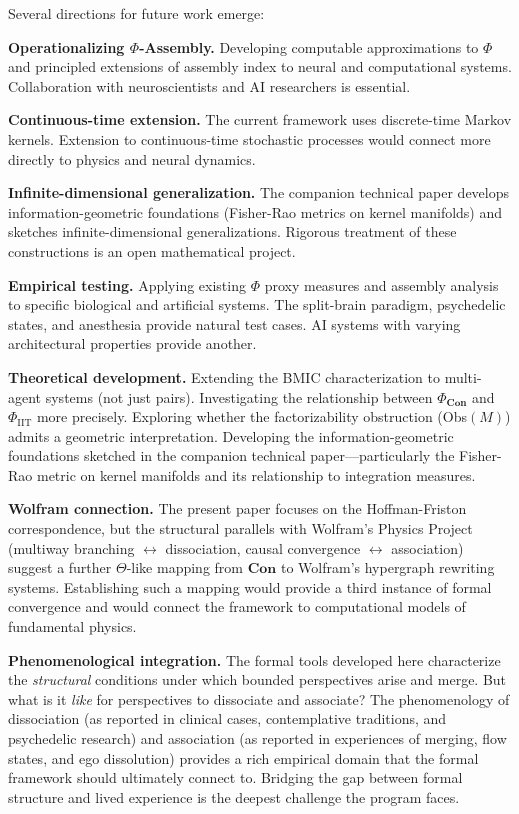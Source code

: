 \documentclass[11pt,a4paper]{article}
\theoremstyle{definition}
\theoremstyle{plain}
\theoremstyle{remark}
\newcommand{\Con}{\mathbf{Con}}
\begin{document}
Several directions for future work emerge:

\textbf{Operationalizing $\Phi$-Assembly.} Developing computable approximations to $\Phi$ and principled extensions of assembly index to neural and computational systems. Collaboration with neuroscientists and AI researchers is essential.

\textbf{Continuous-time extension.} The current framework uses discrete-time Markov kernels. Extension to continuous-time stochastic processes would connect more directly to physics and neural dynamics.

\textbf{Infinite-dimensional generalization.} The companion technical paper develops information-geometric foundations (Fisher-Rao metrics on kernel manifolds) and sketches infinite-dimensional generalizations. Rigorous treatment of these constructions is an open mathematical project.

\textbf{Empirical testing.} Applying existing $\Phi$ proxy measures and assembly analysis to specific biological and artificial systems. The split-brain paradigm, psychedelic states, and anesthesia provide natural test cases. AI systems with varying architectural properties provide another.

\textbf{Theoretical development.} Extending the BMIC characterization to multi-agent systems (not just pairs). Investigating the relationship between $\Phi_{\Con}$ and $\Phi_{\text{IIT}}$ more precisely. Exploring whether the factorizability obstruction (Obs$(M)$) admits a geometric interpretation. Developing the information-geometric foundations sketched in the companion technical paper---particularly the Fisher-Rao metric on kernel manifolds and its relationship to integration measures.

\textbf{Wolfram connection.} The present paper focuses on the Hoffman-Friston correspondence, but the structural parallels with Wolfram's Physics Project (multiway branching $\leftrightarrow$ dissociation, causal convergence $\leftrightarrow$ association) suggest a further $\Theta$-like mapping from $\Con$ to Wolfram's hypergraph rewriting systems. Establishing such a mapping would provide a third instance of formal convergence and would connect the framework to computational models of fundamental physics.

\textbf{Phenomenological integration.} The formal tools developed here characterize the \textit{structural} conditions under which bounded perspectives arise and merge. But what is it \textit{like} for perspectives to dissociate and associate? The phenomenology of dissociation (as reported in clinical cases, contemplative traditions, and psychedelic research) and association (as reported in experiences of merging, flow states, and ego dissolution) provides a rich empirical domain that the formal framework should ultimately connect to. Bridging the gap between formal structure and lived experience is the deepest challenge the program faces.
\end{document}
